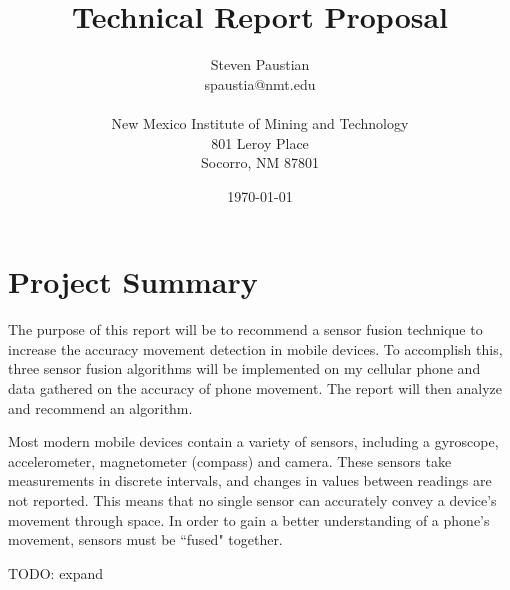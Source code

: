\documentclass[11pt]{article}
\title{Technical Report Proposal}
\author{\begin{tabular}{c}
Steven Paustian \\
spaustia@nmt.edu \\ \\
  New Mexico Institute of Mining and Technology \\
  801 Leroy Place\\
Socorro, NM 87801
\end{tabular}}
\date{\today}
\begin{document}
\maketitle
\nocite{*}


\tableofcontents



\section{Project Summary}

The purpose of this report will be to recommend a sensor fusion technique to increase the accuracy movement detection in mobile devices.  To accomplish this, three sensor fusion algorithms will be implemented on my cellular phone and data gathered on the accuracy of phone movement.  The report will then analyze and recommend an algorithm.


Most modern mobile devices contain a variety of sensors, including a gyroscope, accelerometer, magnetometer (compass) and camera.  These sensors take measurements in discrete intervals, and changes in values between readings are not reported.  This means that no single sensor can accurately convey a device's movement through space.  In order to gain a better understanding of a phone's movement, sensors must be ``fused" together.

TODO: expand
\end{document}
